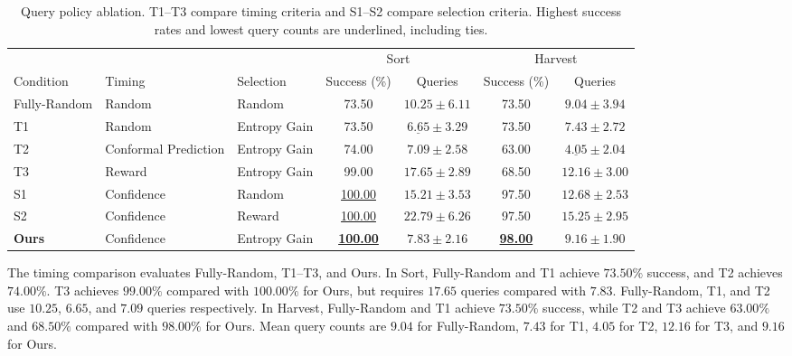 \begin{table}[t]
\centering
\caption{Query policy ablation. T1--T3 compare timing criteria and S1--S2 compare selection criteria. Highest success rates and lowest query counts are underlined, including ties.}
\label{tab:policy_ablation}
\label{tab:when_what_random}
\small
\setlength{\tabcolsep}{4pt}
\begin{tabular}{lllcccc}
\toprule
 & & & \multicolumn{2}{c}{Sort} & \multicolumn{2}{c}{Harvest} \\
\cmidrule(lr){4-5}\cmidrule(lr){6-7}
Condition & Timing & Selection & Success (\%) & Queries & Success (\%) & Queries \\
\midrule
Fully-Random & Random & Random & 73.50 & $10.25 \pm 6.11$ & 73.50 & $9.04 \pm 3.94$ \\
T1 & Random & Entropy Gain & 73.50 & $\underline{6.65} \pm 3.29$ & 73.50 & $7.43 \pm 2.72$ \\
T2 & Conformal Prediction & Entropy Gain & 74.00 & $7.09 \pm 2.58$ & 63.00 & $\underline{4.05} \pm 2.04$ \\
T3 & Reward & Entropy Gain & 99.00 & $17.65 \pm 2.89$ & 68.50 & $12.16 \pm 3.00$ \\
S1 & Confidence & Random & \underline{100.00} & $15.21 \pm 3.53$ & 97.50 & $12.68 \pm 2.53$ \\
S2 & Confidence & Reward & \underline{100.00} & $22.79 \pm 6.26$ & 97.50 & $15.25 \pm 2.95$ \\
\textbf{Ours} & Confidence & Entropy Gain & \textbf{\underline{100.00}} & $\boldsymbol{7.83 \pm 2.16}$ & \textbf{\underline{98.00}} & $\boldsymbol{9.16 \pm 1.90}$ \\
\bottomrule
\end{tabular}
\end{table}

The timing comparison evaluates Fully-Random, T1--T3, and Ours. In Sort, Fully-Random and T1 achieve $73.50\%$ success, and T2 achieves $74.00\%$. T3 achieves $99.00\%$ compared with $100.00\%$ for Ours, but requires $17.65$ queries compared with $7.83$. Fully-Random, T1, and T2 use $10.25$, $6.65$, and $7.09$ queries respectively. In Harvest, Fully-Random and T1 achieve $73.50\%$ success, while T2 and T3 achieve $63.00\%$ and $68.50\%$ compared with $98.00\%$ for Ours. Mean query counts are $9.04$ for Fully-Random, $7.43$ for T1, $4.05$ for T2, $12.16$ for T3, and $9.16$ for Ours.


